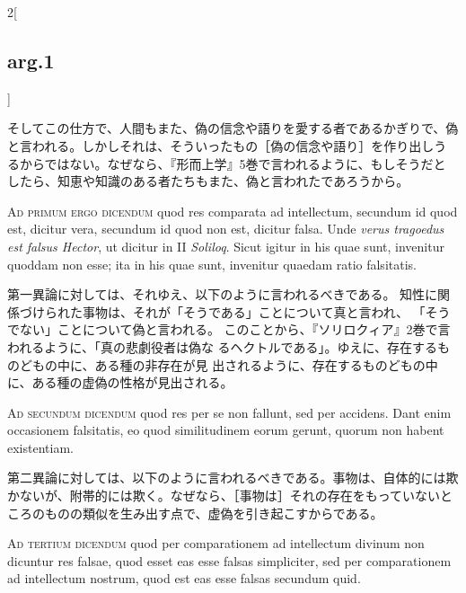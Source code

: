 \documentclass[paper=a4paper,fontsize=10pt,jafontsize=9pt,titlepage]{jlreq}
\begin{document}
\begin{paracol}{2}[\subsection{arg.1}]
\switchcolumn

そしてこの仕方で、人間もまた、偽の信念や語りを愛する者であるかぎりで、偽
 と言われる。しかしそれは、そういったもの［偽の信念や語り］を作り出しう
 るからではない。なぜなら、『形而上学』5巻で言われるように、もしそうだと
 したら、知恵や知識のある者たちもまた、偽と言われたであろうから。

\switchcolumn*[\subsection{ad.1}]


{\scshape Ad primum ergo dicendum} quod res comparata ad intellectum,
secundum id quod est, dicitur vera, secundum id quod non est, dicitur
falsa. Unde {\itshape verus tragoedus est falsus Hector}, ut dicitur in
II {\itshape Soliloq}. Sicut igitur in his quae sunt, invenitur quoddam
non esse; ita in his quae sunt, invenitur quaedam ratio falsitatis.

\switchcolumn

第一異論に対しては、それゆえ、以下のように言われるべきである。
知性に関係づけられた事物は、それが「そうである」ことについて真と言われ、
 「そうでない」ことについて偽と言われる。
このことから、『ソリロクィア』2巻で言われるように、「真の悲劇役者は偽な
 るヘクトルである」。ゆえに、存在するものどもの中に、ある種の非存在が見
 出されるように、存在するものどもの中に、ある種の虚偽の性格が見出される。

\switchcolumn*[\subsection{ad.2}]


{\scshape Ad secundum dicendum} quod res per se non
fallunt, sed per accidens. Dant enim occasionem falsitatis, eo quod
similitudinem eorum gerunt, quorum non habent existentiam.

\switchcolumn

第二異論に対しては、以下のように言われるべきである。事物は、自体的には欺
かないが、附帯的には欺く。なぜなら、［事物は］それの存在をもっていないと
ころのものの類似を生み出す点で、虚偽を引き起こすからである。

\switchcolumn*[\subsection{ad.3}]


{\scshape Ad tertium dicendum} quod per comparationem ad
intellectum divinum non dicuntur res falsae, quod esset eas esse falsas
simpliciter, sed per comparationem ad intellectum nostrum, quod est eas
esse falsas secundum quid.


\end{paracol}
\end{document}
